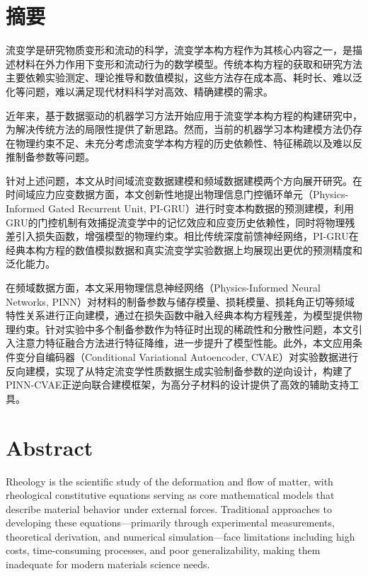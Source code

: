 \chapter{摘\texorpdfstring{\quad}{}要}
流变学是研究物质变形和流动的科学，流变学本构方程作为其核心内容之一，是描述材料在外力作用下变形和流动行为的数学模型。传统本构方程的获取和研究方法主要依赖实验测定、理论推导和数值模拟，这些方法存在成本高、耗时长、难以泛化等问题，难以满足现代材料科学对高效、精确建模的需求。

近年来，基于数据驱动的机器学习方法开始应用于流变学本构方程的构建研究中，为解决传统方法的局限性提供了新思路。然而，当前的机器学习本构建模方法仍存在物理约束不足、未充分考虑流变学本构方程的历史依赖性、特征稀疏以及难以反推制备参数等问题。

针对上述问题，本文从时间域流变数据建模和频域数据建模两个方向展开研究。在时间域应力应变数据方面，本文创新性地提出物理信息门控循环单元（Physics-Informed Gated Recurrent Unit, PI-GRU）进行时变本构数据的预测建模，利用GRU的门控机制有效捕捉流变学中的记忆效应和应变历史依赖性，同时将物理残差引入损失函数，增强模型的物理约束。相比传统深度前馈神经网络，PI-GRU在经典本构方程的数值模拟数据和真实流变学实验数据上均展现出更优的预测精度和泛化能力。

在频域数据方面，本文采用物理信息神经网络（Physics-Informed Neural Networks, PINN）对材料的制备参数与储存模量、损耗模量、损耗角正切等频域特性关系进行正向建模，通过在损失函数中融入经典本构方程残差，为模型提供物理约束。针对实验中多个制备参数作为特征时出现的稀疏性和分散性问题，本文引入注意力特征融合方法进行特征降维，进一步提升了模型性能。此外，本文应用条件变分自编码器（Conditional Variational Autoencoder, CVAE）对实验数据进行反向建模，实现了从特定流变学性质数据生成实验制备参数的逆向设计，构建了PINN-CVAE正逆向联合建模框架，为高分子材料的设计提供了高效的辅助支持工具。

\chapter{Abstract}
Rheology is the scientific study of the deformation and flow of matter, with rheological constitutive equations serving as core mathematical models that describe material behavior under external forces. Traditional approaches to developing these equations—primarily through experimental measurements, theoretical derivation, and numerical simulation—face limitations including high costs, time-consuming processes, and poor generalizability, making them inadequate for modern materials science needs.


